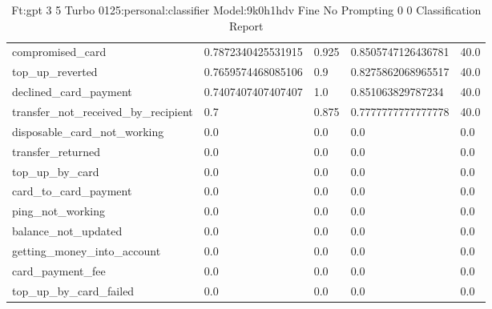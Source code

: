 \begin{table}[!ht]
\begin{tabularx}{\textwidth}{X l l l l}
compromised\_card & \num{0.7872340425531915} & \num{0.925} & \num{0.8505747126436781} & \num{40.0} \\
top\_up\_reverted & \num{0.7659574468085106} & \num{0.9} & \num{0.8275862068965517} & \num{40.0} \\
declined\_card\_payment & \num{0.7407407407407407} & \num{1.0} & \num{0.851063829787234} & \num{40.0} \\
transfer\_not\_received\_by\_recipient & \num{0.7} & \num{0.875} & \num{0.7777777777777778} & \num{40.0} \\
disposable\_card\_not\_working & \num{0.0} & \num{0.0} & \num{0.0} & \num{0.0} \\
transfer\_returned & \num{0.0} & \num{0.0} & \num{0.0} & \num{0.0} \\
top\_up\_by\_card & \num{0.0} & \num{0.0} & \num{0.0} & \num{0.0} \\
card\_to\_card\_payment & \num{0.0} & \num{0.0} & \num{0.0} & \num{0.0} \\
ping\_not\_working & \num{0.0} & \num{0.0} & \num{0.0} & \num{0.0} \\
balance\_not\_updated & \num{0.0} & \num{0.0} & \num{0.0} & \num{0.0} \\
getting\_money\_into\_account & \num{0.0} & \num{0.0} & \num{0.0} & \num{0.0} \\
card\_payment\_fee & \num{0.0} & \num{0.0} & \num{0.0} & \num{0.0} \\
top\_up\_by\_card\_failed & \num{0.0} & \num{0.0} & \num{0.0} & \num{0.0} \\
\bottomrule
\end{tabularx}

        \caption{Ft:gpt 3 5 Turbo 0125:personal:classifier Model:9k0h1hdv Fine No Prompting 0 0 Classification Report}
        \label{tab:ft:gpt-3-5-turbo-0125:personal:classifier-model:9k0H1hdV-fine-no-prompting-0-0-classification-report}
    \end{table}
    